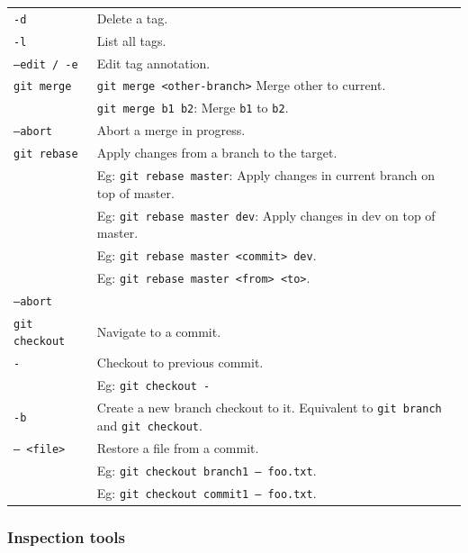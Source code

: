 \begin{tabularx}{\linewidth}{lX}
    \texttt{-d}             & Delete a tag.\\
    \texttt{-l}             & List all tags.\\
    \texttt{--edit / -e}    & Edit tag annotation.\\
\hline
    \texttt{git merge}      & \texttt{git merge <other-branch>} Merge other to 
                                current.\\
                            & \texttt{git merge b1 b2}: Merge \texttt{b1} to 
                                \texttt{b2}.\\
    \texttt{--abort}        & Abort a merge in progress.\\
\hline
    \texttt{git rebase}     & Apply changes from a branch to the target.\\
                            & Eg: \texttt{git rebase master}: Apply changes 
                                in current branch on top of master.\\
                            & Eg: \texttt{git rebase master dev}: Apply changes
                                in dev on top of master.\\
                            & Eg: \texttt{git rebase master <commit> dev}.\\
                            & Eg: \texttt{git rebase master <from> <to>}.\\
    \texttt{--abort}        & \\
\hline
    \texttt{git checkout}   & Navigate to a commit.\\
    \texttt{-}              & Checkout to previous commit. \\
                            & Eg: \texttt{git checkout -}\\
    \texttt{-b}             & Create a new branch checkout to it. Equivalent to
                               \texttt{git branch} and \texttt{git checkout}. \\
    \texttt{-- <file>}      & Restore a file from a commit.\\
                            & Eg: \texttt{git checkout branch1 -- foo.txt}. \\
                            & Eg: \texttt{git checkout commit1 -- foo.txt}. \\
\hline

\end{tabularx}



\vfill\null
\columnbreak


\subsubsection*{Inspection tools}

